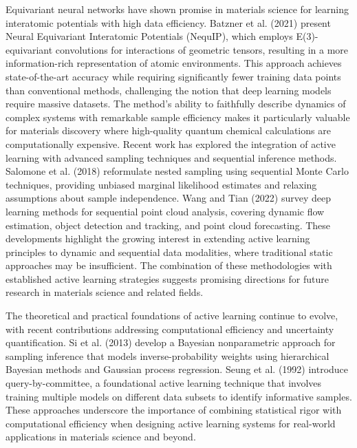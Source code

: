 Equivariant neural networks have shown promise in materials science for learning interatomic potentials with high data efficiency. Batzner et al. (2021) present Neural Equivariant Interatomic Potentials (NequIP), which employs E(3)-equivariant convolutions for interactions of geometric tensors, resulting in a more information-rich representation of atomic environments. This approach achieves state-of-the-art accuracy while requiring significantly fewer training data points than conventional methods, challenging the notion that deep learning models require massive datasets. The method's ability to faithfully describe dynamics of complex systems with remarkable sample efficiency makes it particularly valuable for materials discovery where high-quality quantum chemical calculations are computationally expensive. Recent work has explored the integration of active learning with advanced sampling techniques and sequential inference methods. Salomone et al. (2018) reformulate nested sampling using sequential Monte Carlo techniques, providing unbiased marginal likelihood estimates and relaxing assumptions about sample independence. Wang and Tian (2022) survey deep learning methods for sequential point cloud analysis, covering dynamic flow estimation, object detection and tracking, and point cloud forecasting. These developments highlight the growing interest in extending active learning principles to dynamic and sequential data modalities, where traditional static approaches may be insufficient. The combination of these methodologies with established active learning strategies suggests promising directions for future research in materials science and related fields.

The theoretical and practical foundations of active learning continue to evolve, with recent contributions addressing computational efficiency and uncertainty quantification. Si et al. (2013) develop a Bayesian nonparametric approach for sampling inference that models inverse-probability weights using hierarchical Bayesian methods and Gaussian process regression. Seung et al. (1992) introduce query-by-committee, a foundational active learning technique that involves training multiple models on different data subsets to identify informative samples. These approaches underscore the importance of combining statistical rigor with computational efficiency when designing active learning systems for real-world applications in materials science and beyond.

